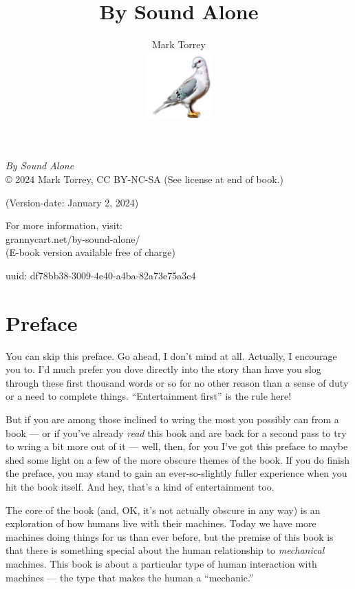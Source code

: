 \documentclass[
]{scrbook}
\title{By Sound Alone}
\author{Mark Torrey\\[5mm] \includegraphics[width=1in]{../cover/pigeon-logo.png}}
\date{}
\begin{document}
\frontmatter
\maketitle

\small
\clearpage
\emph{By Sound Alone}\\
© 2024 Mark Torrey, CC BY-NC-SA (See license at end of book.)

(Version-date: January 2, 2024)

For more information, visit:\\
grannycart.net/by-sound-alone/\\
(E-book version available free of charge)

uuid: df78bb38-3009-4e40-a4ba-82a73e75a3c4
\clearpage

\mainmatter
\newpage

\hypertarget{preface}{%
\section{Preface}\label{preface}}

You can skip this preface. Go ahead, I don't mind at all. Actually, I
encourage you to. I'd much prefer you dove directly into the story than
have you slog through these first thousand words or so for no other
reason than a sense of duty or a need to complete things.
``Entertainment first'' is the rule here!

But if you are among those inclined to wring the most you possibly can
from a book --- or if you've already \emph{read} this book and are back
for a second pass to try to wring a bit more out of it --- well, then,
for you I've got this preface to maybe shed some light on a few of the
more obscure themes of the book. If you do finish the preface, you may
stand to gain an ever-so-slightly fuller experience when you hit the
book itself. And hey, that's a kind of entertainment too.

The core of the book (and, OK, it's not actually obscure in any way) is
an exploration of how humans live with their machines. Today we have
more machines doing things for us than ever before, but the premise of
this book is that there is something special about the human
relationship to \emph{mechanical} machines. This book is about a
particular type of human interaction with machines --- the type that
makes the human a ``mechanic.''
\end{document}
